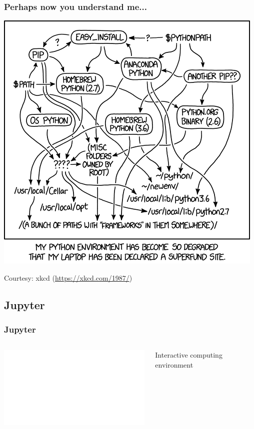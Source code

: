 \documentclass[aspectratio=169]{beamer}
\begin{document}
\begin{frame}
    \frametitle{Perhaps now you understand me...}
    \centering
    \includegraphics[scale=0.35]{images/xkcd-python-env.png}

    {\small Courtesy: xkcd (\url{https://xkcd.com/1987/})}
\end{frame}

\subsection{Jupyter}

\begin{frame}
    \frametitle{Jupyter}
    \begin{columns}
            \begin{center}
                \includegraphics<2->[width=0.7\columnwidth]{images/jupyter-logo.pdf}
            \end{center}
           { {\LARGE Interactive computing environment}}
    \end{columns}
\end{frame}
\end{document}
